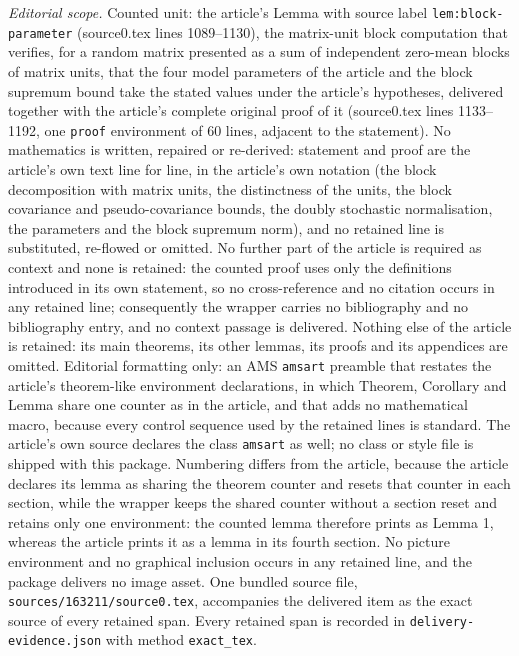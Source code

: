 \documentclass[10pt,a4paper]{amsart}
\theoremstyle{plain}
\theoremstyle{remark}
\begin{document}
\noindent\textit{Editorial scope.} Counted unit: the article's Lemma with source label \texttt{lem:block-parameter} (source0.tex lines 1089--1130), the matrix-unit block computation that verifies, for a random matrix presented as a sum of independent zero-mean blocks of matrix units, that the four model parameters of the article and the block supremum bound take the stated values under the article's hypotheses, delivered together with the article's complete original proof of it (source0.tex lines 1133--1192, one \texttt{proof} environment of 60 lines, adjacent to the statement). No mathematics is written, repaired or re-derived: statement and proof are the article's own text line for line, in the article's own notation (the block decomposition with matrix units, the distinctness of the units, the block covariance and pseudo-covariance bounds, the doubly stochastic normalisation, the parameters and the block supremum norm), and no retained line is substituted, re-flowed or omitted. No further part of the article is required as context and none is retained: the counted proof uses only the definitions introduced in its own statement, so no cross-reference and no citation occurs in any retained line; consequently the wrapper carries no bibliography and no bibliography entry, and no context passage is delivered. Nothing else of the article is retained: its main theorems, its other lemmas, its proofs and its appendices are omitted. Editorial formatting only: an AMS \texttt{amsart} preamble that restates the article's theorem-like environment declarations, in which Theorem, Corollary and Lemma share one counter as in the article, and that adds no mathematical macro, because every control sequence used by the retained lines is standard. The article's own source declares the class \texttt{amsart} as well; no class or style file is shipped with this package. Numbering differs from the article, because the article declares its lemma as sharing the theorem counter and resets that counter in each section, while the wrapper keeps the shared counter without a section reset and retains only one environment: the counted lemma therefore prints as Lemma 1, whereas the article prints it as a lemma in its fourth section. No picture environment and no graphical inclusion occurs in any retained line, and the package delivers no image asset. One bundled source file, \texttt{sources/163211/source0.tex}, accompanies the delivered item as the exact source of every retained span. Every retained span is recorded in \texttt{delivery-evidence.json} with method \texttt{exact\_tex}.
\end{document}
